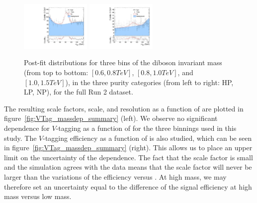 \begin{figure}[htbp]
  \includegraphics[width=0.3\textwidth]{fig/Vtag/PostFit__MJJ__allC_allL_LP_High.pdf}
  \includegraphics[width=0.3\textwidth]{fig/Vtag/PostFit__MJJ__allC_allL_NP_High.pdf}\\
  \caption{
    Post-fit distributions for three bins of the diboson invariant mass \MVV (from top to bottom: $[0.6,0.8\unit{TeV}]$, $[0.8,1.0\unit{TeV}]$, and $[1.0,1.5\unit{TeV}]$), in the three purity categories (from left to right: HP, LP, NP), for the full Run 2 dataset.
  }
  \label{fig:VTag_postfit_massdep}
\end{figure}

The resulting scale factors, scale, and resolution as a function of \MVV are plotted in figure~\ref{fig:VTag_massdep_summary} (left).
We observe no significant dependence for $V$-tagging as a function of \MVV for the three binnings used in this study.
The $V$-tagging efficiency as a function of \MVV is also studied, which can be seen in figure~\ref{fig:VTag_massdep_summary} (right).
This allows us to place an upper limit on the uncertainty of the \pt dependence.
The fact that the scale factor is small and the simulation agrees with the data means that the scale factor will never be larger than the variations of the efficiency versus \MVV.
At high mass, we may therefore set an uncertainty equal to the difference of the signal efficiency at high mass versus low mass.

